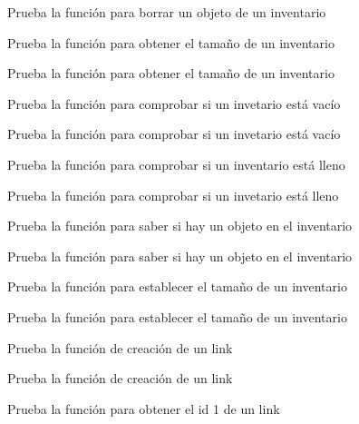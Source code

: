 \begin{DoxyRefList}
Prueba la función para borrar un objeto de un inventario  
\item[\label{test__test000180}%
\Hypertarget{test__test000180}%
Member \hyperlink{inventory__test_8h_a7eb11b5f1ef5608b42ed02d5a9ab53ab}{test1\+\_\+inventory\+\_\+get\+\_\+size} ()]Prueba la función para obtener el tamaño de un inventario 

Prueba la función para obtener el tamaño de un inventario  
\item[\label{test__test000176}%
\Hypertarget{test__test000176}%
Member \hyperlink{inventory__test_8h_afe8c9730e30b58535afc0481970ab2b1}{test1\+\_\+inventory\+\_\+is\+\_\+empty} ()]Prueba la función para comprobar si un invetario está vacío 

Prueba la función para comprobar si un invetario está vacío  
\item[\label{test__test000174}%
\Hypertarget{test__test000174}%
Member \hyperlink{inventory__test_8h_a7eb3ba387e33c42ff45331c9d9aada34}{test1\+\_\+inventory\+\_\+is\+\_\+full} ()]Prueba la función para comprobar si un inventario está lleno 

Prueba la función para comprobar si un invetario está lleno  
\item[\label{test__test000178}%
\Hypertarget{test__test000178}%
Member \hyperlink{inventory__test_8h_a8eb3230ee30561f821224f20d9143bf8}{test1\+\_\+inventory\+\_\+is\+\_\+object\+\_\+in} ()]Prueba la función para saber si hay un objeto en el inventario 

Prueba la función para saber si hay un objeto en el inventario  
\item[\label{test__test000182}%
\Hypertarget{test__test000182}%
Member \hyperlink{inventory__test_8h_a0716920727f7687a74f246a04c2977eb}{test1\+\_\+inventory\+\_\+set\+\_\+size} ()]Prueba la función para establecer el tamaño de un inventario 

Prueba la función para establecer el tamaño de un inventario  
\item[\label{test__test000184}%
\Hypertarget{test__test000184}%
Member \hyperlink{link__test_8h_a82c5ee441ad22caad8272212a9e9cc26}{test1\+\_\+link\+\_\+create} ()]Prueba la función de creación de un link 

Prueba la función de creación de un link  
\item[\label{test__test000198}%
\Hypertarget{test__test000198}%
Member \hyperlink{link__test_8h_acc0691ef1025561d539b2c212ffbcc24}{test1\+\_\+link\+\_\+get\+\_\+conection\+\_\+1} ()]Prueba la función para obtener el id 1 de un link 


\end{DoxyRefList}
